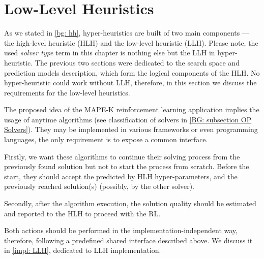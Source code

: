 \section{Low-Level Heuristics}\label{concept: llh}
As we stated in \cref{bg: hh}, hyper-heuristics are built of two main components — the high-level heuristic (HLH) and the low-level heuristic (LLH). Please note, the used \emph{solver type} term in this chapter is nothing else but the LLH in hyper-heuristic. The previous two sections were dedicated to the search space and prediction models description, which form the logical components of the HLH. No hyper-heuristic could work without LLH, therefore, in this section we discuss the requirements for the low-level heuristics.

The proposed idea of the MAPE-K reinforcement learning application implies the usage of anytime algorithms (see classification of solvers in \cref{BG: subsection OP Solvers}).
They may be implemented in various frameworks or even programming languages, the only requirement is to expose a common interface. 

Firstly, we want these algorithms to continue their solving process from the previously found solution but not to start the process from scratch. Before the start, they should accept the predicted by HLH hyper-parameters, and the previously reached solution(s) (possibly, by the other solver). 

Secondly, after the algorithm execution, the solution quality should be estimated and reported to the HLH to proceed with the RL.

Both actions should be performed in the implementation-independent way, therefore, following a predefined shared interface described above. We discuss it in \cref{impl: LLH}, dedicated to LLH implementation.


